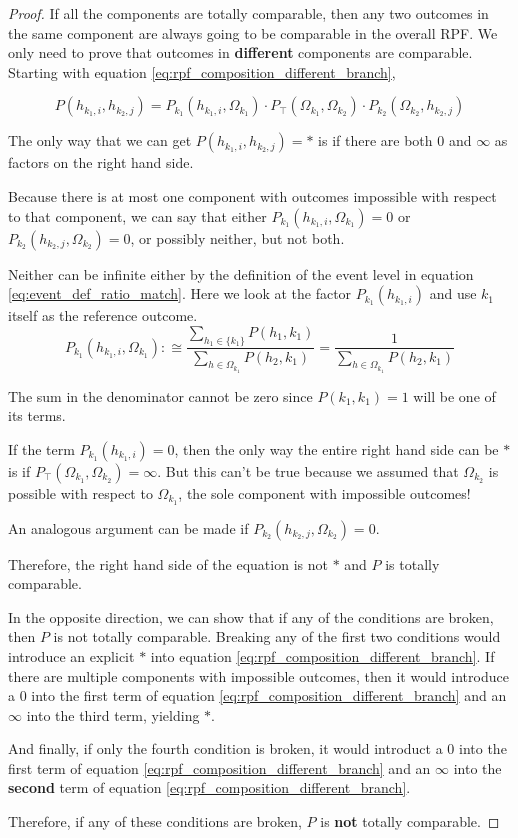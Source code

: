 \documentclass[twoside]{article}
\theoremstyle{plain}%
\theoremstyle{definition}
\theoremstyle{remark}
\begin{document}
\begin{proof}
If all the components are totally comparable, then any two outcomes in the same component are always going to be comparable in the overall RPF. We only need to prove that outcomes in \textbf{different} components are comparable. Starting with equation \ref{eq:rpf_composition_different_branch},

\begin{equation}
P(h_{k_1, i}, h_{k_2, j}) = P_{k_1}(h_{k_1, i}, \Omega_{k_1}) \cdot  P_{\top}(\Omega_{k_1}, \Omega_{k_2}) \cdot P_{k_2}(\Omega_{k_2}, h_{k_2, j})
\end{equation}

The only way that we can get \(P(h_{k_1, i}, h_{k_2, j}) = \ast\) is if there are both \(0\) and \(\infty\) as factors on the right hand side.

Because there is at most one component with outcomes impossible with respect to that component, we can say that either \(P_{k_1}(h_{k_1, i}, \Omega_{k_1}) = 0\) or \(P_{k_2}(h_{k_2, j}, \Omega_{k_2}) = 0\), or possibly neither, but not both.

Neither can be infinite either by the definition of the event level in equation \ref{eq:event_def_ratio_match}. Here we look at the factor \(P_{k_1}(h_{k_1, i})\) and use \(k_1\) itself as the reference outcome.
\[
P_{k_1}(h_{k_1, i}, \Omega_{k_1}) :\cong \frac{\sum_{h_1 \in \{k_1\}} P(h_1, k_1)}{\sum_{h \in \Omega_{k_1}} P(h_2, k_1)} = \frac{1}{\sum_{h \in \Omega_{k_1}} P(h_2, k_1)}
\]

The sum in the denominator cannot be zero since \(P(k_1, k_1) = 1\) will be one of its terms.

If the term \(P_{k_1}(h_{k_1, i}) = 0\), then the only way the entire right hand side can be \(\ast\) is if \(P_{\top}(\Omega_{k_1}, \Omega_{k_2}) = \infty\). But this can't be true because we assumed that \(\Omega_{k_2}\) is possible with respect to \(\Omega_{k_1}\), the sole component with impossible outcomes!

An analogous argument can be made if \(P_{k_2}(h_{k_2, j}, \Omega_{k_2}) = 0\).

Therefore, the right hand side of the equation is not \(\ast\) and \(P\) is totally comparable.

In the opposite direction, we can show that if any of the conditions are broken, then \(P\) is not totally comparable. Breaking any of the first two conditions would introduce an explicit \(\ast\) into equation \ref{eq:rpf_composition_different_branch}. If there are multiple components with impossible outcomes, then it would introduce a \(0\) into the first term of equation \ref{eq:rpf_composition_different_branch} and an \(\infty\) into the third term, yielding \(\ast\).

And finally, if only the fourth condition is broken, it would introduct a 0 into the first term of equation \ref{eq:rpf_composition_different_branch} and an \(\infty\) into the \textbf{second} term of equation \ref{eq:rpf_composition_different_branch}.

Therefore, if any of these conditions are broken, \(P\) is \textbf{not} totally comparable.
\end{proof}
\end{document}
